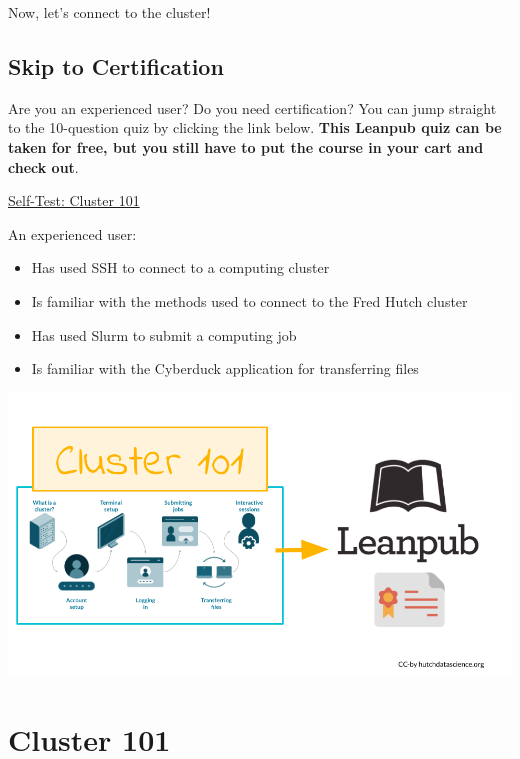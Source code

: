\documentclass[
]{book}
\providecommand{\tightlist}{%
  \setlength{\itemsep}{0pt}\setlength{\parskip}{0pt}}
\begin{document}
Now, let's connect to the cluster!

\hypertarget{skip-to-certification}{%
\chapter*{Skip to Certification}\label{skip-to-certification}}

Are you an experienced user? Do you need certification? You can jump straight to the 10-question quiz by clicking the link below. \textbf{This Leanpub quiz can be taken for free, but you still have to put the course in your cart and check out}.

\href{https://leanpub.com/courses/fredhutch/fredhutchcluster101/quizzes/self_test_101}{Self-Test: Cluster 101}

An experienced user:

\begin{itemize}
\tightlist
\item
  Has used SSH to connect to a computing cluster
\item
  Is familiar with the methods used to connect to the Fred Hutch cluster
\item
  Has used Slurm to submit a computing job
\item
  Is familiar with the Cyberduck application for transferring files
\end{itemize}

\begin{center}\includegraphics[width=0.7\linewidth]{resources/images/skip-to-certification_files/figure-latex//1BQxrVYdKZTbpCaF-i_q9w7s9x034lEXpQZDU-Sl09cs_g162fb43cc93_0_0} \end{center}

\hypertarget{part-cluster-101}{%
\part*{Cluster 101}\label{part-cluster-101}}
\end{document}
